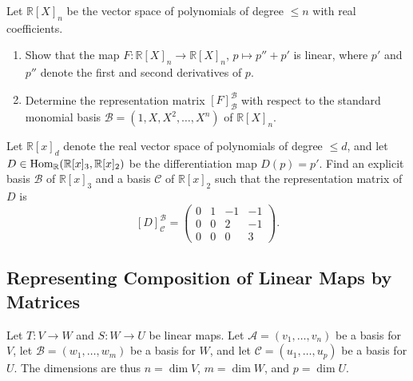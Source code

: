 \begin{exercise}
\label{exc:polynomial_differential_operator_matrix}
Let $\mathbb{R}[X]_n$ be the vector space of polynomials of degree $\le n$ with real coefficients.
\begin{enumerate}
    \item Show that the map $F \colon \mathbb{R}[X]_n \to \mathbb{R}[X]_n$, $p \mapsto p'' + p'$ is linear, where $p'$ and $p''$ denote the first and second derivatives of $p$.
    \item Determine the representation matrix $[F]_{\mathcal{B}}^{\mathcal{B}}$ with respect to the standard monomial basis $\mathcal{B} = (1, X, X^2, \dots, X^n)$ of $\mathbb{R}[X]_n$.
\end{enumerate}
\end{exercise}

\begin{exercise}
\label{exc:differentiation_customized_bases}
Let $\mathbb{R}[x]_d$ denote the real vector space of polynomials of degree $\le d$, and let $D \in \operatorname{Hom}_\mathbb{R}(\mathbb{R}[x]_3, \mathbb{R}[x]_2)$ be the differentiation map $D(p) = p'$.
Find an explicit basis $\mathcal{B}$ of $\mathbb{R}[x]_3$ and a basis $\mathcal{C}$ of $\mathbb{R}[x]_2$ such that the representation matrix of $D$ is
\[
[D]_{\mathcal{C}}^{\mathcal{B}} =
\begin{pmatrix}
0 & 1 & -1 & -1 \\
0 & 0 & 2 & -1 \\
0 & 0 & 0 & 3
\end{pmatrix}.
\]
\end{exercise}


\subsection{Representing Composition of Linear Maps by Matrices}

Let $T: V \to W$ and $S: W \to U$ be linear maps. Let $\mathcal{A} = (v_1, \dots, v_n)$ be a basis for $V$, let $\mathcal{B} = (w_1, \dots, w_m)$ be a basis for $W$, and let $\mathcal{C} = (u_1, \dots, u_p)$ be a basis for $U$. The dimensions are thus $n = \dim V$, $m = \dim W$, and $p = \dim U$.


